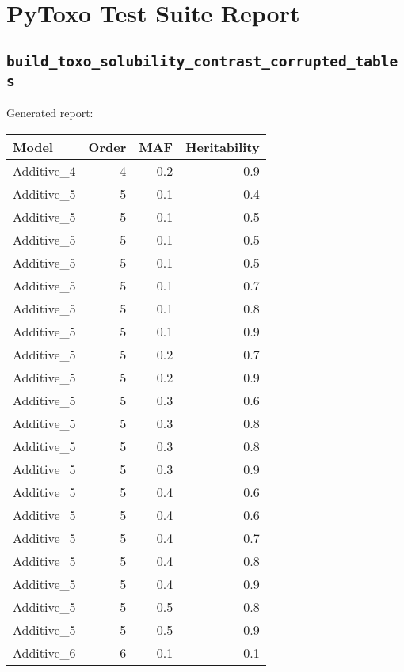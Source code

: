 \documentclass{article}
\begin{document}
\section*{PyToxo Test Suite Report}
\subsection*{\texttt{build\_toxo\_solubility\_contrast\_corrupted\_tables}}
Generated report:

\begin{longtable}[H]{lrrr}
\hline
 Model      &   Order &   MAF &   Heritability \\
\hline
 Additive\_4 &       4 &   0.2 &            0.9 \\
 Additive\_5 &       5 &   0.1 &            0.4 \\
 Additive\_5 &       5 &   0.1 &            0.5 \\
 Additive\_5 &       5 &   0.1 &            0.5 \\
 Additive\_5 &       5 &   0.1 &            0.5 \\
 Additive\_5 &       5 &   0.1 &            0.7 \\
 Additive\_5 &       5 &   0.1 &            0.8 \\
 Additive\_5 &       5 &   0.1 &            0.9 \\
 Additive\_5 &       5 &   0.2 &            0.7 \\
 Additive\_5 &       5 &   0.2 &            0.9 \\
 Additive\_5 &       5 &   0.3 &            0.6 \\
 Additive\_5 &       5 &   0.3 &            0.8 \\
 Additive\_5 &       5 &   0.3 &            0.8 \\
 Additive\_5 &       5 &   0.3 &            0.9 \\
 Additive\_5 &       5 &   0.4 &            0.6 \\
 Additive\_5 &       5 &   0.4 &            0.6 \\
 Additive\_5 &       5 &   0.4 &            0.7 \\
 Additive\_5 &       5 &   0.4 &            0.8 \\
 Additive\_5 &       5 &   0.4 &            0.9 \\
 Additive\_5 &       5 &   0.5 &            0.8 \\
 Additive\_5 &       5 &   0.5 &            0.9 \\
 Additive\_6 &       6 &   0.1 &            0.1 \\

\end{longtable}
\end{document}
